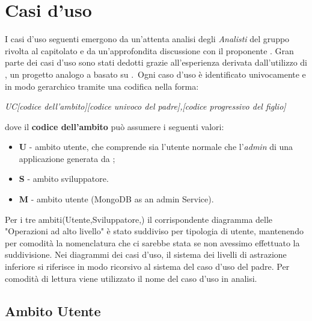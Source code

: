 \section{Casi d'uso}
I casi d'uso seguenti emergono da un'attenta analisi degli \textit{Analisti} del gruppo \GroupName{} rivolta al capitolato e da un'approfondita discussione con il proponente \Proponente{}. Gran parte dei casi d'uso sono stati dedotti grazie all'esperienza derivata dall'utilizzo di , un progetto analogo a \ProjectName{} basato su .\
Ogni caso d'uso è identificato univocamente e in modo gerarchico tramite una codifica nella forma:

\begin{center}

\textit{UC[codice dell'ambito][codice univoco del padre],[codice progressivo del figlio]}

\end{center} 

dove il \textbf{codice dell'ambito} può assumere i seguenti valori:

\begin{itemize}

  \item \textbf{U} - ambito utente, che comprende sia l'utente normale che l'\textit{admin} di una applicazione generata da \ProjectName{};
  \item \textbf{S} - ambito sviluppatore.
  \item \textbf{M} - ambito utente  (MongoDB as an admin Service).

\end{itemize}
Per i tre ambiti(Utente,Sviluppatore,) il corrispondente diagramma delle "Operazioni ad alto livello" è stato suddiviso per tipologia di utente, mantenendo per comodità la nomenclatura che ci sarebbe stata se non avessimo effettuato la suddivisione.
Nei diagrammi dei casi d'uso, il sistema dei livelli di astrazione inferiore si riferisce in modo ricorsivo al sistema del caso d'uso del padre. 
Per comodità di lettura viene utilizzato il nome del caso d'uso in analisi. 


\subsection{Ambito Utente}
